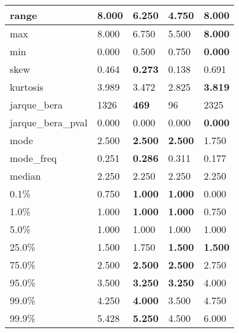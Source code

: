 \begin{table}[H]
\begin{tabular}{|l|m{10em}|m{10em}|m{10em}|m{10em}|}
\hline range & 8.000 & 6.250 & \cellcolor[rgb]{0.9, 0.54, 0.52} 4.750 & \bfseries 8.000 \\
\hline max & 8.000 & 6.750 & \cellcolor[rgb]{0.9, 0.54, 0.52} 5.500 & \bfseries 8.000 \\
\hline min & 0.000 & 0.500 & \cellcolor[rgb]{0.9, 0.54, 0.52} 0.750 & \bfseries 0.000 \\
\hline skew & 0.464 & \bfseries 0.273 & \cellcolor[rgb]{0.9, 0.54, 0.52} 0.138 & 0.691 \\
\hline kurtosis & 3.989 & 3.472 & \cellcolor[rgb]{0.9, 0.54, 0.52} 2.825 & \bfseries 3.819 \\
\hline jarque\_bera & 1326 & \bfseries 469 & \cellcolor[rgb]{0.9, 0.54, 0.52} 96 & 2325 \\
\hline jarque\_bera\_pval & 0.000 & 0.000 & \cellcolor[rgb]{0.9, 0.54, 0.52} 0.000 & \bfseries 0.000 \\
\hline mode & 2.500 & \bfseries 2.500 & \bfseries 2.500 & \cellcolor[rgb]{0.9, 0.54, 0.52} 1.750 \\
\hline mode\_freq & 0.251 & \bfseries 0.286 & 0.311 & \cellcolor[rgb]{0.9, 0.54, 0.52} 0.177 \\
\hline median & 2.250 & 2.250 & 2.250 & 2.250 \\
\hline 0.1\% & 0.750 & \bfseries 1.000 & \bfseries 1.000 & \cellcolor[rgb]{0.9, 0.54, 0.52} 0.000 \\
\hline 1.0\% & 1.000 & \bfseries 1.000 & \bfseries 1.000 & \cellcolor[rgb]{0.9, 0.54, 0.52} 0.750 \\
\hline 5.0\% & 1.000 & 1.000 & 1.000 & 1.000 \\
\hline 25.0\% & 1.500 & \cellcolor[rgb]{0.9, 0.54, 0.52} 1.750 & \bfseries 1.500 & \bfseries 1.500 \\
\hline 75.0\% & 2.500 & \bfseries 2.500 & \bfseries 2.500 & \cellcolor[rgb]{0.9, 0.54, 0.52} 2.750 \\
\hline 95.0\% & 3.500 & \bfseries 3.250 & \bfseries 3.250 & \cellcolor[rgb]{0.9, 0.54, 0.52} 4.000 \\
\hline 99.0\% & 4.250 & \bfseries 4.000 & \cellcolor[rgb]{0.9, 0.54, 0.52} 3.500 & 4.750 \\
\hline 99.9\% & 5.428 & \bfseries 5.250 & \cellcolor[rgb]{0.9, 0.54, 0.52} 4.500 & 6.000 \\
\hline
\end{tabular}
\end{table}
